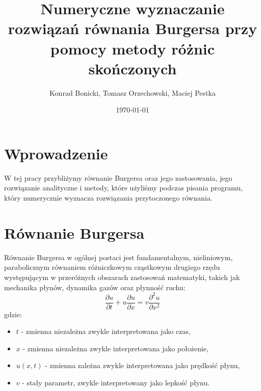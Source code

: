 \documentclass[a4paper,12pt]{article}
\title{Numeryczne wyznaczanie rozwiązań równania Burgersa przy pomocy metody różnic skończonych}
\author{Konrad Bonicki, Tomasz Orzechowski, Maciej Pestka}
\date{\today}
\begin{document}
	
	\maketitle
	
	\tableofcontents
	\newpage
	
	\section{Wprowadzenie}
	W tej pracy przybliżymy równanie Burgersa oraz jego zastosowania, jego rozwiązanie analityczne i metody, które użyliśmy podczas pisania programu, który numerycznie wyznacza rozwiązania przytoczonego równania.
	
	\section{Równanie Burgersa}
	Równanie Burgersa w ogólnej postaci jest fundamentalnym, nieliniowym, parabolicznym równaniem różniczkowym cząstkowym drugiego rzędu występującym w przeróżnych obszarach zastosowań matematyki, takich jak mechanika płynów, dynamika gazów oraz płynność ruchu:
	\begin{equation}
		\frac{\partial u}{\partial t} + u \frac{\partial u}{\partial x} = v \frac{\partial ^2 u}{\partial x^2}
	\end{equation}
	gdzie: 
	\begin{itemize}
		\item $t$ - zmienna niezależna zwykle interpretowana jako czas,
		\item $x$ - zmienna niezależna zwykle interpretowana jako położenie,
		\item $u(x,t)$ - zmienna zależna zwykle interpretowana jako prędkość płynu,
		\item $v$ - stały parametr, zwykle interpretowany jako lepkość płynu.
	\end{itemize}
	
\end{document}

